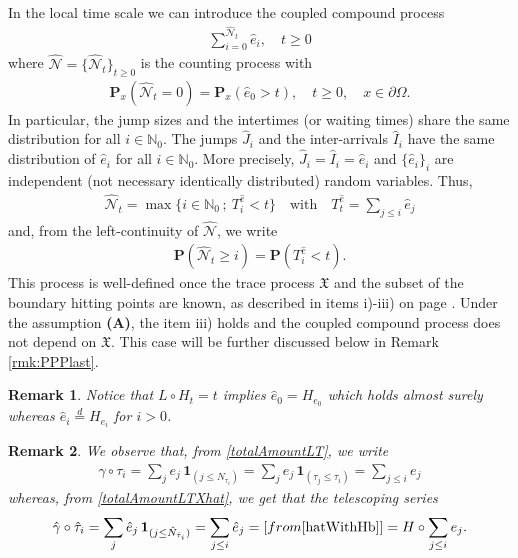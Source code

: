 \documentclass[11pt,a4paper]{article}
\newtheorem{remark}{Remark}[section]
\newcommand{\magenta}{black}
\begin{document}
{\color{\magenta}

In the local time scale we can introduce the coupled compound process 
\begin{align*}
\sum_{i=0}^{\hat{\mathcal{N}}_t} \hat{e}_i, \quad t\geq 0
\end{align*}
where $\hat{\mathcal{N}} = \{\hat{\mathcal{N}}_t\}_{t\geq 0}$ is the counting process with
\begin{align*}
\mathbf{P}_x(\hat{\mathcal{N}}_t=0)= \mathbf{P}_x(\hat{e}_0 >t), \quad t\geq 0, \quad x \in \partial \Omega.
\end{align*}
In particular, the jump sizes and the intertimes (or waiting times) share the same distribution for all $i \in \mathbb{N}_0$. The jumps $\hat{J}_i$ and the inter-arrivals $\hat{I}_i$ have the same distribution of $\hat{e}_i$ for all $i \in \mathbb{N}_0$. More precisely,  $\hat{J}_i=\hat{I}_i=\hat{e}_i$ and $\{\hat{e}_i\}_i$ are independent (not necessary identically distributed) random variables. Thus, 
\begin{align*}
\hat{\mathcal{N}}_t = \max\{i \in \mathbb{N}_0\, ;\ T^{\hat{e}}_i < t \} \quad \textrm{with} \quad T^{\hat{e}}_t = \sum_{j \leq i} \hat{e}_j
\end{align*}
and, from the left-continuity of $\hat{\mathcal{N}}$, we write
\begin{align*}
\mathbf{P}(\hat{\mathcal{N}}_t \geq i ) = \mathbf{P}(T^{\hat{e}}_i < t).
\end{align*}
This process is well-defined once the trace process $\mathfrak{X}$ and the subset of the boundary hitting points are known, as described in items i)-iii) on page  \pageref{propertiesSeqSHT}. Under the assumption {\bf (A)}, the item iii) holds and the coupled compound process does not depend on $\mathfrak{X}$. This case will be further discussed below in Remark \ref{rmk:PPPlast}. 
}




\begin{remark}
Notice that  $L \circ H_t = t$ implies  $\hat{e}_0 = H_{e_0}$ which holds almost surely whereas $\hat{e}_i \stackrel{d}{=} H_{e_i}$ for $i >0$. 
\end{remark}


\begin{remark}
We observe that, from \eqref{totalAmountLT}, we write
\begin{align*}
\gamma \circ \tau_i = \sum_j e_j \, \mathbf{1}_{(j \leq N_{\tau_i})} = \sum_j e_j \, \mathbf{1}_{(\tau_j \leq \tau_i)} = \sum_{j \leq i} e_j
\end{align*}
whereas, from \eqref{totalAmountLTXhat}, we get that the telescoping series
\begin{align*}
\hat{\gamma} \circ \hat{\tau}_i = \sum_{j} \hat{e}_j\, \mathbf{1}_{(j \leq \hat{N}_{\hat{\tau}_i})} = \sum_{j \leq i} \hat{e}_j = [ \textrm{from } \eqref{hatWithHb} ]= H \circ \sum_{j \leq i} e_j.
\end{align*}
\end{remark}
 
\end{document}
